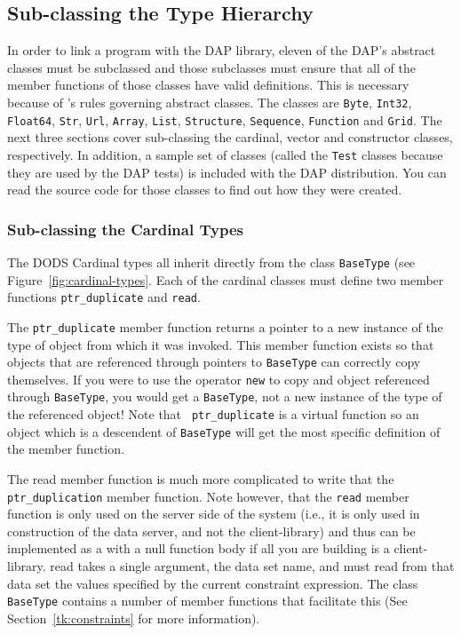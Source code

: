\subsection{Sub-classing the Type Hierarchy}

In order to link a program with the DAP library, eleven of the DAP's abstract
classes must be subclassed and those subclasses must ensure that all of the
member functions of those classes have valid definitions. This is necessary
because of \Cpp's rules governing abstract classes\cite{stroustrup:cpp}. The
classes are {\tt Byte}, {\tt Int32}, {\tt Float64}, {\tt Str}, {\tt Url},
{\tt Array}, {\tt List}, {\tt Structure}, {\tt Sequence}, {\tt Function} and
{\tt Grid}. The next three sections cover sub-classing the cardinal, vector
and constructor classes, respectively. In addition, a sample set of classes
(called the {\tt Test} classes because they are used by the DAP tests) is
included with the DAP distribution. You can read the source code for those
classes to find out how they were created.

\subsubsection{Sub-classing the Cardinal Types}

The DODS Cardinal types all inherit directly from the class {\tt BaseType}
(see Figure~\ref{fig:cardinal-types}. Each of the cardinal classes must
define two member functions {\tt ptr\_duplicate} and {\tt read}.

The {\tt ptr\_duplicate} member function returns a pointer to a new instance
of the type of object from which it was invoked. This member function exists
so that objects that are referenced through pointers to {\tt BaseType} can
correctly copy themselves. If you were to use the operator {\tt new} to copy
and object referenced through {\tt BaseType}, you would get a {\tt BaseType},
not a new instance of the type of the referenced object! Note that {\tt
  ptr\_duplicate} is a virtual function so an object which is a descendent of
{\tt BaseType} will get the most specific definition of the member function.

The read member function is much more complicated to write that the 
{\tt ptr\_duplication} member function. Note however, that the {\tt read}
member 
function is only used on the server side of the system (i.e., it is only used
in construction of the data server, and not the client-library) and thus can
be implemented as a with a null function body if all you are building is a
client-library. read takes a single argument, the data set name, and must
read from that data set the values specified by the current constraint
expression. The class {\tt BaseType} contains a number of member functions
that facilitate this (See Section~\ref{tk:constraints} for more information).

